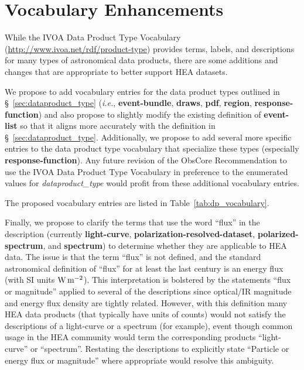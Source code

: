 \documentclass[11pt,a4paper]{ivoa}
\begin{document}
\section{Vocabulary Enhancements}

While the IVOA Data Product Type Vocabulary (\url{http://www.ivoa.net/rdf/product-type}) provides terms, labels, and descriptions for many types of astronomical data products, there are some additions and changes that are appropriate to better support HEA datasets.

We propose to add vocabulary entries for the data product types outlined in \S~\ref{sec:dataproduct_type} ({\em i.e.\/}, {\bf event-bundle}, {\bf draws}, {\bf pdf}, {\bf region}, {\bf response-function}) and also propose to slightly modify the existing definition of {\bf event-list} so that it aligns more accurately with the definition in \S~\ref{sec:dataproduct_type}.  Additionally, we propose to add several more specific entries to the data product type vocabulary that specialize these types (especially {\bf response-function}).  Any future revision of the ObsCore Recommendation to use the IVOA Data Product Type Vocabulary in preference to the enumerated values for {\em dataproduct\_type\/} would profit from these additional vocabulary entries.

The proposed vocabulary entries are listed in Table~\ref{tab:dp_vocabulary}.

Finally, we propose to clarify the terms that use the word ``flux'' in the description (currently {\bf light-curve}, {\bf polarization-resolved-dataset}, {\bf polarized-spectrum}, and {\bf spectrum}) to determine whether they are applicable to HEA data.  The issue is that the term ``flux'' is not defined, and the standard astronomical definition of ``flux'' for at least the last century is an energy flux (with SI units $\rm W\,m^{-2}$).  This interpretation is bolstered by the statements ``flux or magnitude'' applied to several of the descriptions since optical/IR magnitude and energy flux density are tightly related.  However, with this definition many HEA data products (that typically have units of counts) would not satisfy the descriptions of a light-curve or a spectrum (for example), event though common usage in the HEA community would term the corresponding products ``light-curve'' or ``spectrum''.  Restating the descriptions to explicitly state ``Particle or energy flux or magnitude'' where appropriate would resolve this ambiguity.
\end{document}
